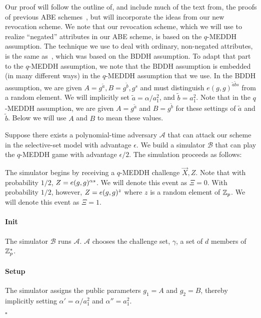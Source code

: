 \documentclass[a4paper, 11pt]{article}
\newenvironment{proof}{\par\noindent{\bf Proof.}}{$\square$\par\bigskip}
\newcommand{\G}{\ensuremath{\mathbb{G}}}
\theoremstyle{definition}
\begin{document}
\begin{proof}
Our proof will follow the outline of, and include much of the text
from, the proofs of previous ABE schemes~\cite{sw05,GPSW06,OSW07}, but
will incorporate the ideas from our new revocation scheme.  We note
that our revocation scheme, which we will use to realize ``negated''
attributes in our ABE scheme, is based on the $q$-MEDDH
assumption. The technique we use to deal with ordinary, non-negated
attributes, is the same as~\cite{GPSW06}, which was based on the BDDH
assumption.  To adapt that part to the $q$-MEDDH assumption, we note
that the BDDH assumption is embedded (in many different ways) in the
$q$-MEDDH assumption that we use.  In the BDDH assumption, we are
given $A = g^{\tilde{a}}, B = g^{\tilde{b}}, g^s$ and must distinguish
$e(g,g)^{\tilde{a}\tilde{b}s}$ from a random element. We will
implicitly set $\tilde{a} = \alpha / a_1^2$, and $\tilde{b} = a_1^2$.
Note that in the $q$-MEDDH assumption, we are given $A =
g^{\tilde{a}}$ and $B = g^{\tilde{b}}$ for these settings of
$\tilde{a}$ and $\tilde{b}$.  Below we will use $A$ and $B$ to mean
these values.

Suppose there exists a polynomial-time adversary $\mathcal{A}$ that
can attack our scheme in the selective-set model with advantage
$\epsilon$. We build a simulator $\mathcal{B}$ that can play the
$q$-MEDDH game with advantage $\epsilon/2$. The simulation proceeds as
follows:


The simulator begins by receiving a $q$-MEDDH
challenge $\vec{X},Z$.  Note that with probability $1/2$,
$Z = e(g,g)^{\alpha s}$.  We will denote this event as $\Xi=0$.
With probability $1/2$, however, $Z = e(g,g)^z$ where $z$ is a random element of $\mathbb{Z}_p$. We will denote this event as $\Xi=1$.

\paragraph{Init} The simulator $\mathcal{B}$ runs
$\mathcal{A}$. $\mathcal{A}$ chooses the challenge set, $\gamma$, a
set of $d$ members of $\mathbb{Z}_p^*$.

\paragraph{Setup}
The simulator assigns the public
parameters $g_1=A$ and $g_2=B$, thereby implicitly setting
$\alpha' = \alpha/a_1^2$ and $\alpha'' = a_1^2$.



\end{proof}
\end{document}
